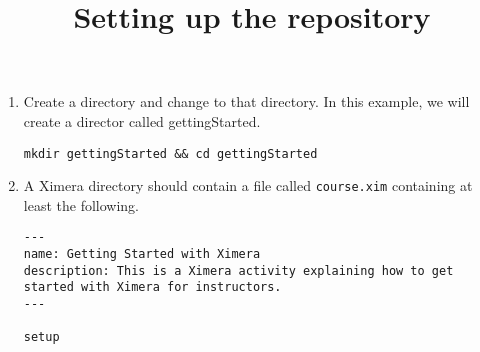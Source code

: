 \documentclass{ximera}
\begin{document}
\title{Setting up the repository}
\begin{enumerate}
\item Create a directory and change to that directory.
In this example, we will create a director called gettingStarted.
\begin{center}
\begin{verbatim}
mkdir gettingStarted && cd gettingStarted
\end{verbatim}
\end{center}
\item A Ximera directory should contain
a file called \verb!course.xim! containing
at least the following.
\begin{verbatim}
---
name: Getting Started with Ximera
description: This is a Ximera activity explaining how to get started with Ximera for instructors.
---

setup
\end{verbatim}

\end{enumerate}
\end{document}
